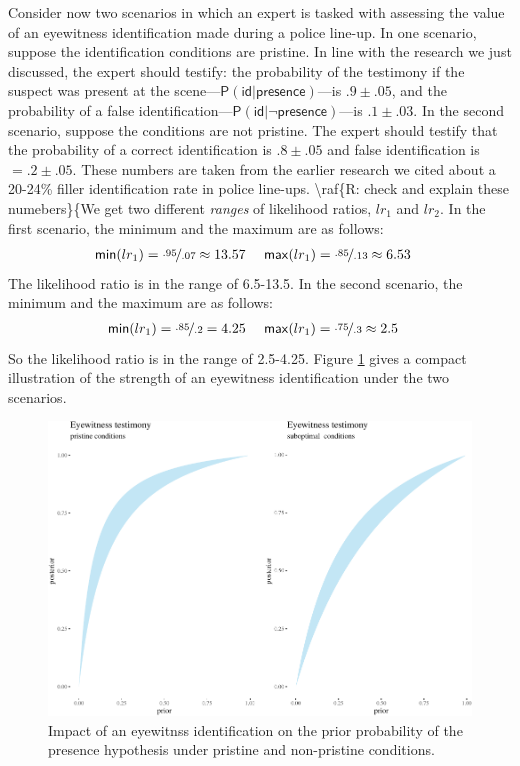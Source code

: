 \documentclass[
  10pt,
  dvipsnames,enabledeprecatedfontcommands]{scrartcl}
\newcommand{\pr}[1]{\mathsf{P}(#1)}
\begin{document}
Consider now two scenarios in which an expert is tasked with assessing
the value of an eyewitness identification made during a police line-up.
In one scenario, suppose the identification conditions are pristine. In
line with the research we just discussed, the expert should testify: the
probability of the testimony if the suspect was present at the
scene---\(\pr{\textsf{id} \vert \textsf{presence}}\)---is
\(.9 \pm .05\), and the probability of a false
identification---\(\pr{\textsf{id} \vert \neg \textsf{presence}}\)---is
\(.1\pm .03\). In the second scenario, suppose the conditions are not
pristine. The expert should testify that the probability of a correct
identification is \(.8 \pm .05\) and false identification is
\(=.2 \pm .05\). These numbers are taken from the earlier research we
cited about a 20-24\% filler identification rate in police line-ups.
\textbackslash raf\{R: check and explain these numebers\}\{We get two
different \emph{ranges} of likelihood ratios, \(lr_1\) and \(lr_2\). In
the first scenario, the minimum and the maximum are as follows:
\begin{align*}
\mathsf{min}(lr_1) = \nicefrac{.95}{.07} \approx 13.57  & \,\,\,\,\,\,\,\,  \mathsf{max}(lr_1) = \nicefrac{.85}{.13} \approx 6.53  
\end{align*} \noindent The likelihood ratio is in the range of 6.5-13.5.
In the second scenario, the minimum and the maximum are as follows:
\begin{align*}
\mathsf{min}(lr_1) = \nicefrac{.85}{.2} =  4.25 &  \,\,\,\,\,\,\,\,   \mathsf{max}(lr_1) = \nicefrac{.75}{.3} \approx 2.5  
\end{align*} \noindent So the likelihood ratio is in the range of
2.5-4.25. Figure \ref{fig:eyewitness3b} gives a compact illustration of
the strength of an eyewitness identification under the two scenarios.

\begin{figure}[h]

\begin{center}\includegraphics[width=1\linewidth]{lr-chapter4_files/figure-latex/eyewitness2b-1} \end{center}
\caption{Impact of an eyewitnss identification on the prior probability of the presence hypothesis under pristine and non-pristine conditions.}
\label{fig:eyewitness3b}
\end{figure}
\end{document}
